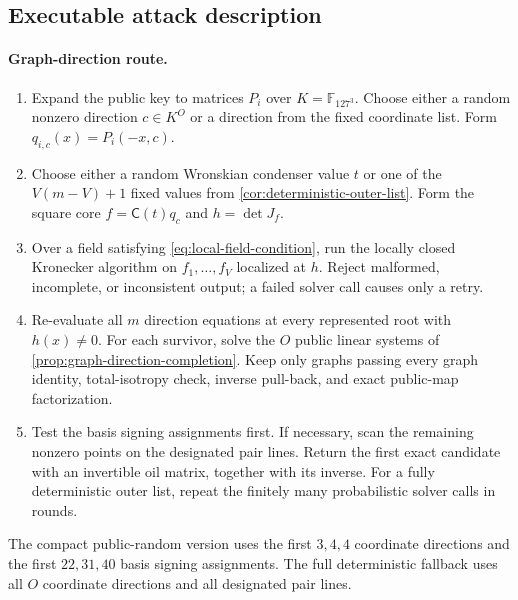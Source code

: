 \documentclass[11pt,a4paper]{article}
\theoremstyle{definition}
\theoremstyle{remark}
\newcommand{\F}{\mathbb F}
\begin{document}
\subsection{Executable attack description}

\paragraph{Graph-direction route.}
\begin{enumerate}
\item Expand the public key to matrices $P_i$ over $K=\F_{127^3}$.  Choose either a random nonzero direction $c\in K^O$ or a direction from the fixed coordinate list.  Form $q_{i,c}(x)=P_i(-x,c)$.
\item Choose either a random Wronskian condenser value $t$ or one of the $V(m-V)+1$ fixed values from \cref{cor:deterministic-outer-list}.  Form the square core $f=\mathsf C(t)q_c$ and $h=\det J_f$.
\item Over a field satisfying \eqref{eq:local-field-condition}, run the locally closed Kronecker algorithm on $f_1,\ldots,f_V$ localized at $h$.  Reject malformed, incomplete, or inconsistent output; a failed solver call causes only a retry.
\item Re-evaluate all $m$ direction equations at every represented root with $h(x)\ne0$.  For each survivor, solve the $O$ public linear systems of \cref{prop:graph-direction-completion}.  Keep only graphs passing every graph identity, total-isotropy check, inverse pull-back, and exact public-map factorization.
\item Test the basis signing assignments first.  If necessary, scan the remaining nonzero points on the designated pair lines.  Return the first exact candidate with an invertible oil matrix, together with its inverse.  For a fully deterministic outer list, repeat the finitely many probabilistic solver calls in rounds.
\end{enumerate}
The compact public-random version uses the first $3,4,4$ coordinate directions and the first $22,31,40$ basis signing assignments.  The full deterministic fallback uses all $O$ coordinate directions and all designated pair lines.
\end{document}
